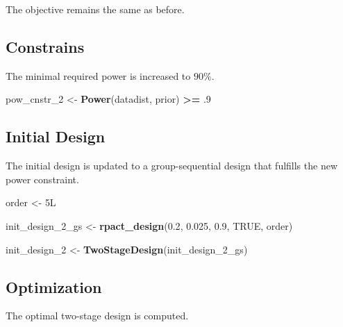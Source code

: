 \documentclass[]{book}
\newenvironment{Shaded}{\begin{snugshade}}{\end{snugshade}}
\newcommand{\DecValTok}[1]{\textcolor[rgb]{0.00,0.00,0.81}{#1}}
\newcommand{\FloatTok}[1]{\textcolor[rgb]{0.00,0.00,0.81}{#1}}
\newcommand{\KeywordTok}[1]{\textcolor[rgb]{0.13,0.29,0.53}{\textbf{#1}}}
\newcommand{\NormalTok}[1]{#1}
\newcommand{\OperatorTok}[1]{\textcolor[rgb]{0.81,0.36,0.00}{\textbf{#1}}}
\newcommand{\OtherTok}[1]{\textcolor[rgb]{0.56,0.35,0.01}{#1}}
\newcommand{\StringTok}[1]{\textcolor[rgb]{0.31,0.60,0.02}{#1}}
\begin{document}
The objective remains the same as before.

\hypertarget{constrains-8}{%
\subsection{Constrains}\label{constrains-8}}

The minimal required power is increased to \(90\%\).

\begin{Shaded}
\begin{Highlighting}[]
\NormalTok{pow_cnstr_}\DecValTok{2}\NormalTok{ <-}\StringTok{ }\KeywordTok{Power}\NormalTok{(datadist, prior) }\OperatorTok{>=}\StringTok{ }\FloatTok{.9}
\end{Highlighting}
\end{Shaded}

\hypertarget{initial-design-6}{%
\subsection{Initial Design}\label{initial-design-6}}

The initial design is updated to a group-sequential design that fulfills
the new power constraint.

\begin{Shaded}
\begin{Highlighting}[]
\NormalTok{order <-}\StringTok{ }\NormalTok{5L }

\NormalTok{init_design_}\DecValTok{2}\NormalTok{_gs <-}\StringTok{ }\KeywordTok{rpact_design}\NormalTok{(}\FloatTok{0.2}\NormalTok{, }\FloatTok{0.025}\NormalTok{, }\FloatTok{0.9}\NormalTok{, }\OtherTok{TRUE}\NormalTok{, order)}

\NormalTok{init_design_}\DecValTok{2}\NormalTok{    <-}\StringTok{ }\KeywordTok{TwoStageDesign}\NormalTok{(init_design_}\DecValTok{2}\NormalTok{_gs)}
\end{Highlighting}
\end{Shaded}

\hypertarget{optimization-7}{%
\subsection{Optimization}\label{optimization-7}}

The optimal two-stage design is computed.
\end{document}
